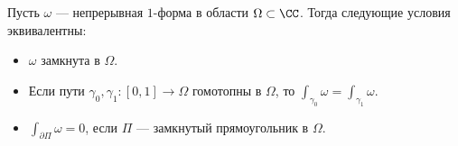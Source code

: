 \begin{thm}
 Пусть $\omega$ --- непрерывная $1$-форма в области $\Omega \subset \CC$. Тогда следующие условия эквивалентны:
 \begin{itemize}
  \item $\omega$ замкнута в $\Omega$.
  \item Если пути $\gamma_0, \gamma_1 \colon [0,1] \to \Omega$ гомотопны в $\Omega$, то $\int_{\gamma_0} \omega = \int_{\gamma_1} \omega $.
  \item $\int_{\partial \Pi} \omega = 0$, если $\Pi$ --- замкнутый прямоугольник в $\Omega$. 
	\begin{figure}[ht]
    \centering
    \label{fig:closed-rectangle-and-its-border}
	\end{figure}
 \end{itemize}
\end{thm}
